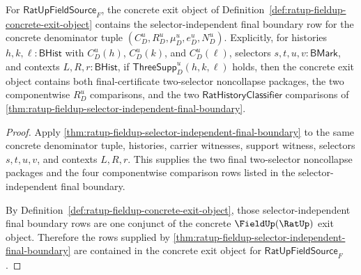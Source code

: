 \begin{theorem}
\label{thm:ratup-fieldup-concrete-exit-selector-independent-final-boundary}
For $\mathsf{RatUpFieldSource}_F$, the concrete exit object of
Definition~\ref{def:ratup-fieldup-concrete-exit-object} contains the
selector-independent final boundary row for the concrete denominator tuple
$(C_D^u,R_D^u,\mu_D^u,e_D^u,N_D^u)$. Explicitly, for histories
$h,k,\ell:\mathsf{BHist}$ with $C_D^u(h)$, $C_D^u(k)$, and $C_D^u(\ell)$,
selectors $s,t,u,v:\mathsf{BMark}$, and contexts $L,R,r:\mathsf{BHist}$, if
$\mathsf{ThreeSupp}_D^u(h,k,\ell)$ holds, then the concrete exit object
contains both final-certificate two-selector noncollapse packages, the two
componentwise $R_D^u$ comparisons, and the two
$\mathsf{RatHistoryClassifier}$ comparisons of
\autoref{thm:ratup-fieldup-selector-independent-final-boundary}.
\end{theorem}
\begin{proof}
Apply \autoref{thm:ratup-fieldup-selector-independent-final-boundary} to the
same concrete denominator tuple, histories, carrier witnesses, support witness,
selectors $s,t,u,v$, and contexts $L,R,r$. This supplies the two final
two-selector noncollapse packages and the four componentwise comparison rows
listed in the selector-independent final boundary.

By Definition~\ref{def:ratup-fieldup-concrete-exit-object}, those
selector-independent final boundary rows are one conjunct of the concrete
$\FieldUp(\RatUp)$ exit object. Therefore the rows supplied by
\autoref{thm:ratup-fieldup-selector-independent-final-boundary} are contained in
the concrete exit object for $\mathsf{RatUpFieldSource}_F$.
\end{proof}

